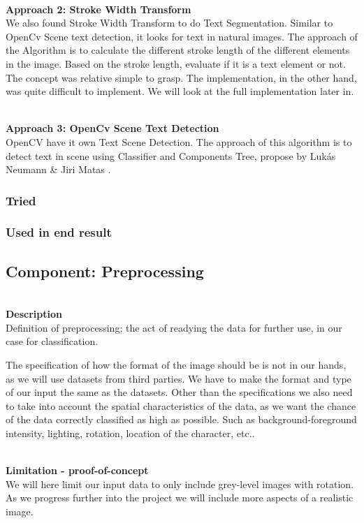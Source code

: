 \documentclass[11pt,a4paper,UKenglish]{article}
\begin{document}
\noindent \\ \textbf{Approach 2: Stroke Width Transform}
\noindent \\ We also found Stroke Width Transform to do Text Segmentation\cite{epshtein_stroke_2010}. Similar to OpenCv Scene text detection, it looks for text in natural images. The approach of the Algorithm is to calculate the different stroke length of the different elements in the image. Based on the stroke length, evaluate if it is a text element or not. The concept was relative simple to grasp. The implementation, in the other hand, was quite difficult to implement. We will look at the full implementation later in.

\noindent \\ \textbf{Approach 3: OpenCv Scene Text Detection}
\noindent \\ OpenCV have it own Text Scene Detection. The approach of this algorithm is to detect text in scene using Classifier and Components Tree, propose by Lukás Neumann \& Jiri Matas \cite{neumann_real-time_2012}.


\subsubsection{Tried}
\subsubsection{Used in end result}

\subsection{Component: Preprocessing}
\label{Method:Preprocessing}
\noindent \\ \textbf{Description}
\noindent \\ Definition of preprocessing; the act of readying the data for
further use, in our case for classification. \par
The specification of how the format of the image should be is not in our hands,
as we will use datasets from third parties. We have to make the format and
type of our input the same as the datasets. Other than the specifications we
also need to take into account the spatial characteristics of the data, as we
want the chance of the data correctly classified as high as possible. Such as
background-foreground intensity, lighting, rotation, location of the
character, etc.. \par

\noindent \\ \textbf{Limitation - proof-of-concept}
\noindent \\ We will here limit our input data to only include grey-level
images with rotation. As we progress further into the project we will include
more aspects of a realistic image.
\end{document}
